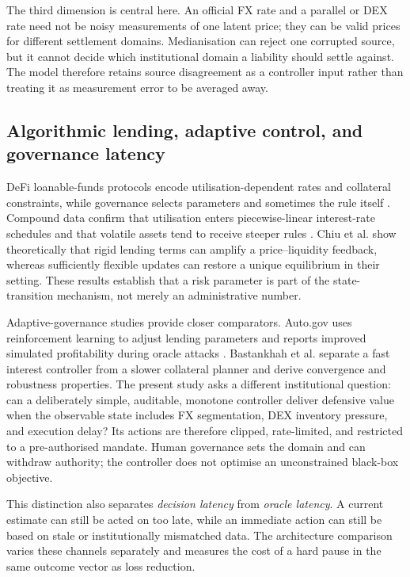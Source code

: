 \documentclass[sn-vancouver,Numbered]{sn-jnl}
\begin{document}
The third dimension is central here. An official FX rate and a parallel or DEX rate need not be noisy measurements of one latent price; they can be valid prices for different settlement domains. Medianisation can reject one corrupted source, but it cannot decide which institutional domain a liability should settle against. The model therefore retains source disagreement as a controller input rather than treating it as measurement error to be averaged away.

\subsection{Algorithmic lending, adaptive control, and governance latency}

DeFi loanable-funds protocols encode utilisation-dependent rates and collateral constraints, while governance selects parameters and sometimes the rule itself \cite{Gudgeon2020,Werner2022}. Compound data confirm that utilisation enters piecewise-linear interest-rate schedules and that volatile assets tend to receive steeper rules \cite{Chaudhary2023}. Chiu et al. \cite{Chiu2023} show theoretically that rigid lending terms can amplify a price--liquidity feedback, whereas sufficiently flexible updates can restore a unique equilibrium in their setting. These results establish that a risk parameter is part of the state-transition mechanism, not merely an administrative number.

Adaptive-governance studies provide closer comparators. Auto.gov uses reinforcement learning to adjust lending parameters and reports improved simulated profitability during oracle attacks \cite{Xu2025}. Bastankhah et al. \cite{Bastankhah2024} separate a fast interest controller from a slower collateral planner and derive convergence and robustness properties. The present study asks a different institutional question: can a deliberately simple, auditable, monotone controller deliver defensive value when the observable state includes FX segmentation, DEX inventory pressure, and execution delay? Its actions are therefore clipped, rate-limited, and restricted to a pre-authorised mandate. Human governance sets the domain and can withdraw authority; the controller does not optimise an unconstrained black-box objective.

This distinction also separates \emph{decision latency} from \emph{oracle latency}. A current estimate can still be acted on too late, while an immediate action can still be based on stale or institutionally mismatched data. The architecture comparison varies these channels separately and measures the cost of a hard pause in the same outcome vector as loss reduction.
\end{document}
